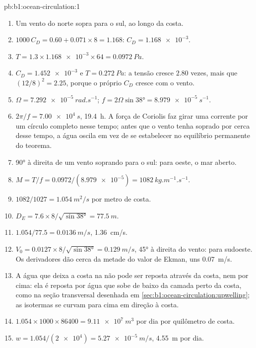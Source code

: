 \begin{solution}{pb:b1:ocean-circulation:1}
\begin{enumerate}
  \item Um vento do norte sopra para o sul, ao longo da costa.
  \item $1000\,C_D = 0.60 + 0.071 \times 8 = 1.168$: $C_D = \num{1.168e-3}$.
  \item $T = 1.3 \times \num{1.168e-3} \times 64 = \qty{0.0972}{Pa}$.
  \item $C_D = \num{1.452e-3}$ e $T = \qty{0.272}{Pa}$: a tensão cresce $2.80$ vezes,
        mais que $(12/8)^2 = 2.25$, porque o próprio $C_D$ cresce com o vento.
  \item $\Omega = \qty{7.292e-5}{rad.s^{-1}}$; $f = 2\Omega\sin\ang{38} =
        \qty{8.979e-5}{s^{-1}}$.
  \item $2\pi/f = \qty{7.00e4}{s}$, \qty{19.4}{h}. A força de Coriolis faz girar uma
        corrente por um círculo completo nesse tempo; antes que o vento tenha soprado por
        cerca desse tempo, a água oscila em vez de se estabelecer no
        equilíbrio permanente do teorema.
  \item \ang{90} à direita de um vento soprando para o sul: para oeste, o mar
        aberto.
  \item $M = T/f = 0.0972/(\num{8.979e-5}) = \qty{1082}{kg.m^{-1}.s^{-1}}$.
  \item $1082/1027 = \qty{1.054}{m^2/s}$ por metro de costa.
  \item $D_E = 7.6 \times 8/\sqrt{\sin\ang{38}} = \qty{77.5}{m}$.
  \item $1.054/77.5 = \qty{0.0136}{m/s}$, \qty{1.36}{cm/s}.
  \item $V_0 = 0.0127 \times 8/\sqrt{\sin\ang{38}} = \qty{0.129}{m/s}$, \ang{45} à
        direita do vento: para sudoeste. Os derivadores dão cerca da metade
        do valor de Ekman, uns \qty{0.07}{m/s}.
  \item A água que deixa a costa na  não pode ser reposta através da
        costa, nem por cima: ela é reposta por água que sobe de baixo da camada
        perto da costa, como na seção transversal desenhada em
        \cref{sec:b1:ocean-circulation:upwelling}; as isotermas se curvam para cima em direção à
        costa.
  \item $1.054 \times 1000 \times 86400 = \qty{9.11e7}{m^3}$ por dia por quilômetro de
        costa.
  \item $w = 1.054/(\num{2e4}) = \qty{5.27e-5}{m/s}$, \qty{4.55}{m} por dia.

\end{enumerate}
\end{solution}
